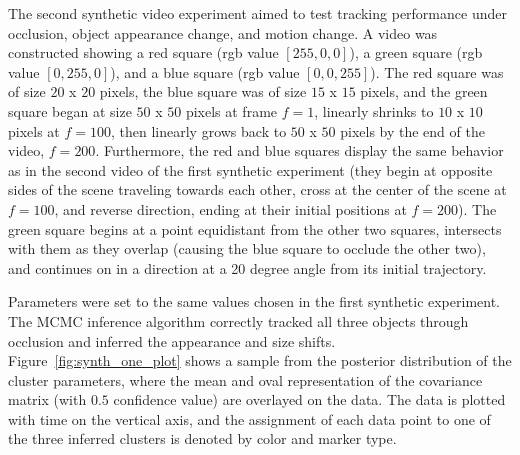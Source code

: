 \documentclass[twocolumn, final]{svjour3}
\begin{document}
The second synthetic video experiment aimed to test tracking performance under occlusion, object appearance change, and motion change. A video was constructed showing a red square (rgb value $[255,0,0]$), a green square (rgb value $[0,255,0]$), and a blue square (rgb value $[0,0,255]$). The red square was of size $20$ x $20$ pixels, the blue square was of size $15$ x $15$ pixels, and the green square began at size $50$ x $50$ pixels at frame $f=1$, linearly shrinks to $10$ x $10$ pixels at $f=100$, then linearly grows back to $50$ x $50$ pixels by the end of the video, $f=200$. Furthermore, the red and blue squares display the same behavior as in the second video of the first synthetic experiment (they begin at opposite sides of the scene traveling towards each other, cross at the center of the scene at $f=100$, and reverse direction, ending at their initial positions at $f=200$). The green square begins at a point equidistant from the other two squares, intersects with them as they overlap (causing the blue square to occlude the other two), and continues on in a direction at a 20 degree angle from its initial trajectory.

Parameters were set to the same values chosen in the first synthetic experiment. The MCMC inference algorithm correctly tracked all three objects through occlusion and inferred the appearance and size shifts. Figure~\ref{fig:synth_one_plot} shows a sample from the posterior distribution of the cluster parameters, where the mean and oval representation of the covariance matrix (with $0.5$ confidence value) are overlayed on the data. The data is plotted with time on the vertical axis, and the assignment of each data point to one of the three inferred clusters is denoted by color and marker type. 
\end{document}
